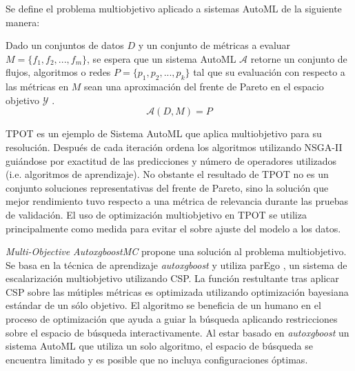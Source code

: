 Se define el problema multiobjetivo aplicado a sistemas AutoML de la siguiente manera:
\begin{definition}\label{background:def:moo-automl-problem}
    Dado un conjuntos de datos $D$ y  un conjunto de m\'etricas a evaluar $M = \{f_1, f_2, ...,f_m\}$, se espera que  un sistema AutoML $\mathcal{A}$ retorne un conjunto de flujos, algoritmos o redes $P = \{p_1, p_2, ..., p_k\}$ tal que su evaluaci\'on con respecto a las m\'etricas en $M$ sean una aproximaci\'on del frente de Pareto en el espacio objetivo $\mathcal{Y}$ .
    \begin{equation*}
        \mathcal{A}(D, M) = P  
    \end{equation*}
\end{definition}

TPOT  es un ejemplo de Sistema AutoML que aplica multiobjetivo para su resoluci\'on. Despu\'es de cada iteraci\'on ordena los algoritmos utilizando NSGA-II  gui\'andose por exactitud de las predicciones y n\'umero de operadores utilizados (i.e. algoritmos de aprendizaje). No obstante el resultado de TPOT no es un conjunto soluciones representativas del frente de Pareto, sino la soluci\'on que mejor rendimiento tuvo respecto a una m\'etrica de relevancia durante las pruebas de validaci\'on. El uso de optimizaci\'on multiobjetivo en TPOT se utiliza principalmente como medida para evitar el sobre ajuste del modelo a los datos.

\textit {Multi-Objective AutoxgboostMC} propone una soluci\'on al problema multiobjetivo. Se basa en la t\'ecnica de aprendizaje \textit{autoxgboost}  y utiliza  parEgo , un sistema de escalarizaci\'on multiobjetivo utilizando CSP. La funci\'on restultante tras aplicar CSP sobre las m\'utiples m\'etricas  es optimizada utilizando optimizaci\'on bayesiana est\'andar de un s\'olo objetivo.
El algoritmo se beneficia de un humano en el proceso de optimizaci\'on que ayuda a guiar la b\'usqueda aplicando restricciones sobre el espacio de b\'usqueda interactivamente.
Al estar basado en \textit{autoxgboost}  un sistema AutoML que utiliza un solo algoritmo, el espacio de b\'usqueda se encuentra limitado y es posible que no incluya configuraciones \'optimas.


